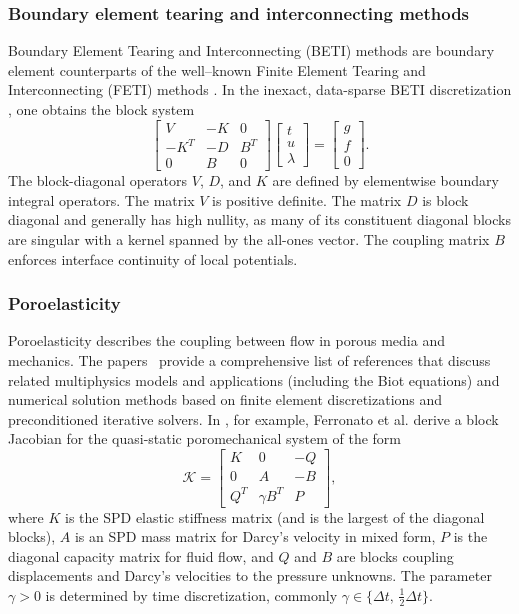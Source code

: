 \documentclass{article}
\newcommand{\sK}{\mathcal{K}}
\begin{document}
\subsubsection{Boundary element tearing and interconnecting methods}
Boundary Element Tearing and Interconnecting (BETI) methods are boundary element counterparts of
the well–known Finite Element Tearing and Interconnecting (FETI)
methods \cite{farhat1991method}. In the inexact, data-sparse BETI discretization \cite{losz07}, one obtains the block system
\[
\begin{bmatrix}
V & -K & 0 \\
-K^T & -D & B^T \\
0 & B & 0
\end{bmatrix}
\begin{bmatrix}
t \\
u \\
\lambda
\end{bmatrix} = \begin{bmatrix}
g \\
f \\
0
\end{bmatrix}.
\]
The block-diagonal operators $V$, $D$, and $K$ are defined by elementwise boundary integral operators. The matrix $V$ is positive definite. The matrix $D$ is block diagonal and generally has high nullity, as many of its constituent diagonal blocks are singular with a kernel spanned by the all-ones vector. The coupling matrix $B$ enforces interface continuity of local potentials.

\subsubsection{Poroelasticity}
Poroelasticity describes the coupling between flow in porous media and mechanics. The papers~\cite{Castelletto2016,ferronato2010,ffjct19} provide a comprehensive list of references that discuss related multiphysics models and applications (including the Biot equations) and numerical solution methods based on finite element discretizations and preconditioned iterative solvers.
In \cite{ffjct19}, for example, Ferronato et al.
derive a block Jacobian for the quasi-static poromechanical system of the form
\[
\sK = \begin{bmatrix}
    K & 0 & -Q \\
    0 & A & -B \\
    Q^T & \gamma B^T & P
\end{bmatrix},
\]
where $K$ is the SPD elastic stiffness matrix (and is the largest of the diagonal blocks), $A$ is an SPD mass matrix for Darcy's velocity in mixed form, $P$ is the diagonal capacity matrix for fluid flow, and $Q$ and $B$ are blocks coupling displacements and Darcy's velocities to the pressure unknowns. The parameter \(\gamma>0\) is determined by time discretization, commonly \(\gamma\in\{\Delta t,\,\tfrac12\Delta t\}\).
\end{document}
